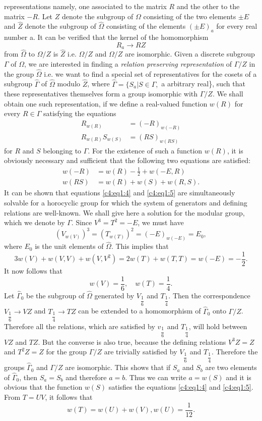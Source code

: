 representations namely, one associated to the matrix $R$ and the other
to the matrix $-R$. Let $Z$ denote the subgroup of $\Omega$ consisting
of the two elements $\pm E$ and $\hat{Z}$ denote the subgroup of
$\hat{\Omega}$ consisting of the elements $(\pm E)_a$ for every real
number a. It can be verified that the kernel of the homomorphism
$$
R_a \to RZ
$$
from $\hat{\Omega}$ to $\Omega /Z$ is $\hat{Z}$ i.e. $\hat{\Omega}/Z$
and $\Omega/Z$ are isomorphic. Given a discrete \pageoriginale
subgroup $\Gamma$ of $\Omega$, we are interested in finding a
\textit{relation preserving representation} of $\Gamma/Z$ in the group
$\hat{\Omega}$ i.e. we want to find a special set of representatives
for the cosets of a subgroup $\hat{\Gamma}$ of $\hat{\Omega}$ modulo
$\hat{Z}$, where $\hat{\Gamma}=\{S_a|S\in \Gamma,$ a arbitrary
real\}, such that these representatives themselves form a group
isomorphic with $\Gamma/Z$. We shall obtain one such representation,
if we define a real-valued function $w(R)$ for every $R\in
\Gamma$ satisfying the equations
\begin{align*}
R_{w(R)} & = (-R)_{w(-R)} \tag{2}\label{c4:eq1:2}\\
R_{w(R)} S_{w(S)} & = (RS)_{w(RS)}\tag{3}\label{c4:eq1:3}
\end{align*}
for $R$ and $S$ belonging to $\Gamma$. For the existence of such a
function $w(R)$, it is obviously necessary and sufficient that the
following two equations are satisfied:
\begin{align*}
w(-R) & = w(R) -\frac{1}{2} + w(-E,R)\tag{4}\label{c4:eq1:4}\\
w(RS) & = w(R) + w(S) + w(R,S). \tag{5}\label{c4:eq1:5}
\end{align*}
It can be shown that equations \eqref{c4:eq1:4} 
and \eqref{c4:eq1:5} are simultaneously solvable
for a horocyclic group for which the system of generators and defining
relations are well-known. We shall give here a solution for the
modular group, which we denote by $\Gamma$. Since $V^3=T^2=-E$, we
must have 
$$
(V_{w(V)})^3 = (T_{w(T)})^2 = (-E)_{w(-E)} = E_0,
$$
where $E_0$ is the unit elements of $\hat{\Omega}$. This implies that 
$$
3w(V) + w(V,V) + w(V,V^2) = 2w (T) + w(T,T) = w (-E) = - \frac{1}{2}. 
$$
It now follows that 
$$
w(V) = \frac{1}{6} , \quad w(T) = \frac{1}{4}.
$$\pageoriginale 
Let $\hat{\Gamma}_0$ be the subgroup of $\hat{\Omega}$ generated by
$V_{\dfrac{1}{6}}$ and $T_{\dfrac{1}{4}}$. Then the correspondence
$V_{\dfrac{1}{6}} \to VZ$ and $T_{\dfrac{1}{4}} \to TZ$ can be
extended to a homomorphism of $\hat{\Gamma}_0$ onto
$\Gamma/Z$. Therefore all the relations, which are satisfied by
$v_{\dfrac{1}{6}}$ and $T_{\dfrac{1}{4}}$, will hold between $VZ$ and
$TZ$. But the converse is also true, because the defining relations
$V^3Z=Z$ and $T^2Z=Z$ for the group $\Gamma/Z$ are trivially satisfied
by $V_{\dfrac{1}{6}}$ and $T_{\dfrac{1}{4}}$. Therefore the groups
$\hat{\Gamma}_0$ and $\Gamma/Z$ are isomorphic. This shows that if
$S_a$ and $S_b$ are two elements of $\hat{\Gamma}_0$, then $S_a=S_b$
and therefore $a=b$. Thus we can write $a=w(S)$ and it is obvious that
the function $w(S)$ satisfies the equations \eqref{c4:eq1:4} 
and \eqref{c4:eq1:5}. From $T=UV$,
it follows that 
$$
w(T) =w(U) + w(V), w(U) =\frac{1}{12}.
$$

